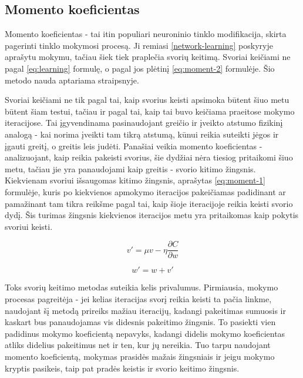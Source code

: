 \documentclass{VUMIFPSbakalaurinis}
\begin{document}
\subsection{Momento koeficientas}

Momento koeficientas - tai itin populiari neuroninio tinklo modifikacija, skirta pagerinti tinklo mokymosi procesą.
Ji remiasi \ref{network-learning} poskyryje aprašytu mokymu, tačiau šiek tiek praplečia svorių keitimą.
Svoriai keičiami ne pagal \ref{eq:learning} formulę, o pagal jos plėtinį \ref{eq:moment-2} formulėje.
Šio metodo nauda aptariama \cite[1218~psl.]{1007668} straipsnyje.

Svoriai keičiami ne tik pagal tai, kaip svorius keisti apsimoka būtent šiuo metu būtent šiam testui, tačiau ir pagal tai, kaip tai buvo keičiama praeitose mokymo iteracijose.
Tai įgyvendinama pasinaudojant greičio ir įveikto atstumo fizikinį analogą - kai norima įveikti tam tikrą atstumą, kūnui reikia suteikti jėgos ir įgauti greitį, o greitis leis judėti.
Panašiai veikia momento koeficientas - analizuojant, kaip reikia pakeisti svorius, šie dydžiai nėra tiesiog pritaikomi šiuo metu, tačiau jie yra panaudojami kaip greitis - svorio kitimo žingsnis.
Kiekvienam svoriui išsaugomas kitimo žingsnis, aprašytas \ref{eq:moment-1} formulėje, kuris po kiekvienos apmokymo iteracijos pakeičiamas padidinant ar pamažinant tam tikra reikšme pagal tai, kaip šioje iteracijoje reikia keisti svorio dydį.
Šis turimas žingsnis kiekvienos iteracijos metu yra pritaikomas kaip pokytis svoriui keisti.

\begin{equation} \label{eq:moment-1}
v' = \mu v - \eta \frac{\partial C}{\partial w}
\end{equation}

\begin{equation} \label{eq:moment-2}
w' = w + v'
\end{equation}

Toks svorių keitimo metodas suteikia kelis privalumus.
Pirmiausia, mokymo procesas pagreitėja - jei kelias iteracijas svorį reikia keisti ta pačia linkme, naudojant šį metodą prireiks mažiau iteracijų, kadangi pakeitimas sumuosis ir kaskart bus panaudojamas vis didesnis pakeitimo žingsnis.
To pasiekti vien padidinus mokymo koeficientą nepavyks, kadangi didelis mokymo koeficientas atliks didelius pakeitimus net ir ten, kur jų nereikia.
Tuo tarpu naudojant momento koeficientą, mokymas prasidės mažais žingsniais ir jeigu mokymo kryptis pasikeis, taip pat pradės keistis ir svorio keitimo žingsnis.
\end{document}
